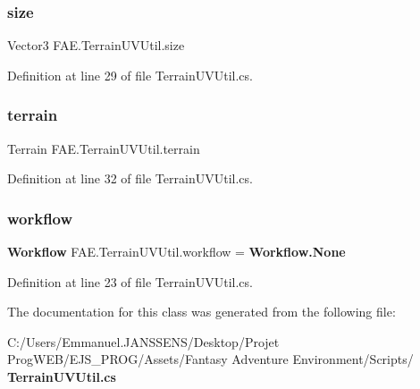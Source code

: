 \mbox{\label{class_f_a_e_1_1_terrain_u_v_util_aad6c913374f3f72c3608995f9ade8274}} 
\subsubsection{size}
{\footnotesize\ttfamily Vector3 F\+A\+E.\+Terrain\+U\+V\+Util.\+size}



Definition at line 29 of file Terrain\+U\+V\+Util.\+cs.

\mbox{\label{class_f_a_e_1_1_terrain_u_v_util_a1db756da69af185723e35bd444f72782}} 
\subsubsection{terrain}
{\footnotesize\ttfamily Terrain F\+A\+E.\+Terrain\+U\+V\+Util.\+terrain}



Definition at line 32 of file Terrain\+U\+V\+Util.\+cs.

\mbox{\label{class_f_a_e_1_1_terrain_u_v_util_a30414ea488b0241fe93108dd9ef47aab}} 
\subsubsection{workflow}
{\footnotesize\ttfamily \textbf{ Workflow} F\+A\+E.\+Terrain\+U\+V\+Util.\+workflow = \textbf{ Workflow.\+None}}



Definition at line 23 of file Terrain\+U\+V\+Util.\+cs.



The documentation for this class was generated from the following file\+:\begin{DoxyCompactItemize}
\item 
C\+:/\+Users/\+Emmanuel.\+J\+A\+N\+S\+S\+E\+N\+S/\+Desktop/\+Projet Prog\+W\+E\+B/\+E\+J\+S\+\_\+\+P\+R\+O\+G/\+Assets/\+Fantasy Adventure Environment/\+Scripts/\textbf{ Terrain\+U\+V\+Util.\+cs}\end{DoxyCompactItemize}
